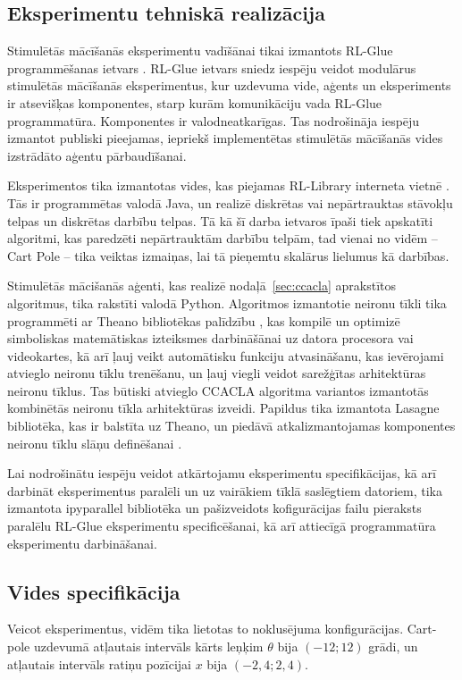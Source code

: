 \documentclass{ludis} %
\begin{document}
\subsection{Eksperimentu tehniskā realizācija}
Stimulētās mācīšanās eksperimentu vadīšānai tikai izmantots RL-Glue
programmēšanas ietvars \autocite{rl-glue}. RL-Glue ietvars sniedz iespēju veidot
modulārus stimulētās mācīšanās eksperimentus, kur uzdevuma vide, aģents un
eksperiments ir atsevišķas komponentes, starp kurām komunikāciju vada RL-Glue
programmatūra. Komponentes ir valodneatkarīgas. Tas nodrošināja iespēju izmantot
publiski pieejamas, iepriekš implementētas stimulētās mācīšanās vides izstrādāto
aģentu pārbaudīšanai. 

Eksperimentos tika izmantotas vides, kas piejamas RL-Library interneta vietnē
\autocite{rl-library}. Tās ir programmētas valodā Java, un realizē diskrētas vai
nepārtrauktas stāvokļu telpas un diskrētas darbību telpas. Tā kā šī darba
ietvaros īpaši tiek apskatīti algoritmi, kas paredzēti nepārtrauktām darbību
telpām, tad vienai no vidēm -- Cart Pole -- tika veiktas izmaiņas, lai tā
pieņemtu skalārus lielumus kā darbības.

Stimulētās mācišanās aģenti, kas realizē nodaļā~\ref{sec:ccacla} aprakstītos
algoritmus, tika rakstīti valodā Python. Algoritmos izmantotie neironu tīkli
tika programmēti ar Theano bibliotēkas palīdzību \autocite{Bastien-Theano-2012}
\autocite{bergstra+al:2010-scipy}, kas kompilē un optimizē simboliskas
matemātiskas izteiksmes darbināšānai uz datora procesora vai videokartes, kā arī
ļauj veikt automātisku funkciju atvasināšanu, kas ievērojami atvieglo neironu
tīklu trenēšanu, un ļauj viegli veidot sarežģītas arhitektūras neironu tīklus.
Tas būtiski atvieglo CCACLA algoritma variantos izmantotās kombinētās neironu
tīkla arhitektūras izveidi. Papildus tika izmantota Lasagne bibliotēka, kas ir
balstīta uz Theano, un piedāvā atkalizmantojamas komponentes neironu tīklu slāņu
definēšanai \autocite{lasagne}.

Lai nodrošinātu iespēju veidot atkārtojamu eksperimentu specifikācijas, kā arī
darbināt eksperimentus paralēli un uz vairākiem tīklā saslēgtiem datoriem, tika
izmantota ipyparallel bibliotēka \autocite{ipyparallel} un pašizveidots
kofigurācijas failu pieraksts paralēlu RL-Glue eksperimentu specificēšanai, kā
arī attiecīgā programmatūra eksperimentu darbināšanai.

\subsection{Vides specifikācija}
Veicot eksperimentus, vidēm tika lietotas to noklusējuma konfigurācijas.
Cart-pole uzdevumā atļautais intervāls kārts leņķim $\theta$ bija $(-12; 12)$
grādi, un atļautais intervāls ratiņu pozīcijai $x$ bija $(-2,4; 2,4)$.
\end{document}
